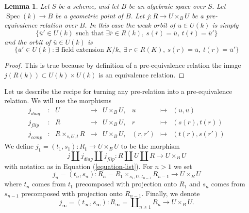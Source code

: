 \documentclass{stacks-project}
\theoremstyle{plain}
\newtheorem{lemma}[subsection]{Lemma}
\theoremstyle{definition}
\theoremstyle{remark}
\numberwithin{equation}{subsection}
\def\Spec{\mathop{\mathrm{Spec}}}
\begin{document}
\begin{lemma}
\label{lemma-weak-orbit-pre-equivalence}
Let $S$ be a scheme, and let $B$ be an algebraic space over $S$.
Let $\Spec(k) \to B$ be a geometric point of $B$.
Let $j : R \to U \times_B U$ be a pre-equivalence relation over $B$.
In this case the weak orbit of $\overline{u} \in U(k)$ is simply
$$
\{
\overline{u}' \in U(k)
\text{ such that }
\exists \overline{r} \in R(k),
\ s(\overline{r}) = \overline{u},
\ t(\overline{r}) = \overline{u}'
\}
$$
and the orbit of $\overline{u} \in U(k)$ is
$$
\{
\overline{u}' \in U(k) :
\exists\text{ field extension }K/k, \ \exists\ r \in R(K),
\ s(r) = \overline{u}, \ t(r) = \overline{u}'\}
$$
\end{lemma}

\begin{proof}
This is true because by definition of a pre-equivalence relation the image
$j(R(k)) \subset U(k) \times U(k)$ is an equivalence relation.
\end{proof}

\noindent
Let us describe the recipe for turning any pre-relation into a
pre-equivalence relation. We will use the morphisms
\begin{equation}
\label{equation-list}
\begin{matrix}
j_{diag} &
: &
U &
\longrightarrow &
U \times_B U, &
u &
\longmapsto &
(u, u) \\
j_{flip} &
: &
R &
\longrightarrow &
U \times_B U, &
r &
\longmapsto &
(s(r), t(r)) \\
j_{comp} &
: &
R \times_{s, U, t} R &
\longrightarrow &
U \times_B U, &
(r, r') &
\longmapsto &
(t(r), s(r'))
\end{matrix}
\end{equation}
We define $j_1 = (t_1, s_1) : R_1 \to U \times_B U$ to be the morphism
$$
j \amalg j_{diag} \amalg j_{flip} :
R \amalg U \amalg R
\longrightarrow
U \times_B U
$$
with notation as in
Equation (\ref{equation-list}).
For $n > 1$ we set
$$
j_n = (t_n, s_n) :
R_n = R_1 \times_{s_1, U, t_{n - 1}} R_{n - 1} \longrightarrow U \times_B U
$$
where $t_n$ comes from $t_1$ precomposed with projection onto $R_1$ and
$s_n$ comes from $s_{n - 1}$ precomposed with projection onto $R_{n - 1}$.
Finally, we denote
$$
j_\infty = (t_\infty, s_\infty) :
R_\infty = \coprod\nolimits_{n \geq 1} R_n
\longrightarrow
U \times_B U.
$$
\end{document}
